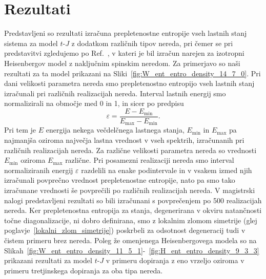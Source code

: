 \section{Rezultati}
Predstavljeni so rezultati izračuna prepletenostne entropije vseh lastnih stanj sistema za model $t$-$J$ z dodatkom različnih tipov nereda, pri čemer se pri predstavitvi zgledujemo po Ref.~\cite{luitz2015many}, v kateri je bil izračun narejen za izotropni Heisenbergov model z naključnim spinskim neredom. Za primerjavo so naši rezultati za ta model prikazani na Sliki~\ref{fig:W_ent_entro_density_14_7_0}. Pri dani velikosti parametra nereda smo prepletenostno entropijo vseh lastnih stanj izračunali pri različnih realizacijah nereda. Interval lastnih energij smo normalizirali na območje med 0 in 1, in sicer po predpisu 
\begin{equation}
\varepsilon=\frac{E-E_\mathrm{min}}{E_\mathrm{max}-E_\mathrm{min}}.
\end{equation}
Pri tem je $E$ energija nekega večdelčnega lastnega stanja, $E_\mathrm{min}$ in $E_\mathrm{max}$ pa najmanjša oziroma največja lastna vrednost v vseh spektrih, izračunanih pri različnih realizacijah nereda. Za različne velikosti parametra nereda so vrednosti $E_\mathrm{min}$ oziroma $E_\mathrm{max}$ različne. Pri posamezni realizaciji nereda smo interval normaliziranih energij $\varepsilon$ razdelili na enake podintervale in v vsakem izmed njih izračunali povprečno vrednost prepletenostne entropije, nato pa smo tako izračunane vrednosti še povprečili po različnih realizacijah nereda. V magistrski nalogi predstavljeni rezultati so bili izračunani s povprečenjem po 500 realizacijah nereda. Ker prepletenostna entropija za stanja, degenerirana v okviru natančnosti točne diagonalizacije, ni dobro definirana, smo z lokalnim zlomom simetrije (glej poglavje~\ref{lokalni_zlom_simetrije}) poskrbeli za odsotnost degeneracij tudi v čistem primeru brez nereda.
Poleg že omenjenega Heisenbergovega modela so na Slikah~\ref{fig:W_ent_entro_density_11_5_1}-~\ref{fig:H_ent_entro_density_9_3_3} prikazani rezultati za model $t$-$J$ v primeru dopiranja z eno vrzeljo oziroma v primeru tretjinskega dopiranja za oba tipa nereda.
